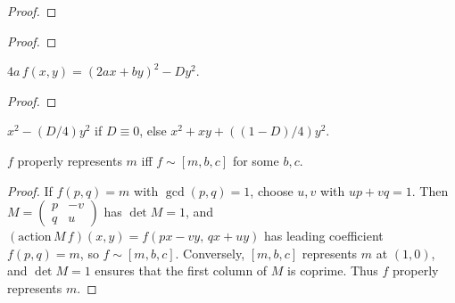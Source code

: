 \begin{theorem}
  \label{thm:proper_equiv_equivalence}
  \leanok
\end{theorem}
\begin{proof}\leanok\end{proof}

\begin{theorem}
  \label{thm:discr_invariant}
  \leanok
\end{theorem}
\begin{proof}\leanok\end{proof}

\begin{theorem}[Cox (2.4)]
  \label{eq:four_mul_eval}
  \leanok
  $4a\,f(x,y) = (2ax+by)^2 - D y^2$.
\end{theorem}
\begin{proof}\leanok\end{proof}

\begin{definition}
  \label{def:principal_form}
  \leanok
  $x^2 - (D/4)y^2$ if $D \equiv 0$, else $x^2 + xy + ((1-D)/4)y^2$.
\end{definition}

\begin{theorem}
  \label{lem:repr_iff_equiv}
  \leanok
  $f$ properly represents $m$ iff $f \sim [m,b,c]$ for some $b,c$.
\end{theorem}
\begin{proof}\leanok
If $f(p,q)=m$ with $\gcd(p,q)=1$, choose $u,v$ with $up+vq=1$. Then
$M=\left(\begin{smallmatrix}p&-v\\q&u\end{smallmatrix}\right)$ has $\det M=1$, and
$(\mathrm{action}\,M\,f)(x,y)=f(px-vy,\,qx+uy)$ has leading coefficient $f(p,q)=m$,
so $f\sim[m,b,c]$. Conversely, $[m,b,c]$ represents $m$ at $(1,0)$, and $\det M=1$
ensures that the first column of $M$ is coprime. Thus $f$ properly represents $m$.
\end{proof}

